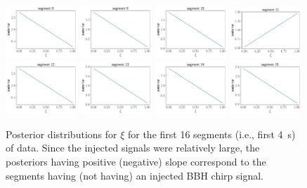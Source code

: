 \begin{figure}[htbp!]
\begin{center}
\includegraphics[width=0.24\textwidth]{Figures/posterior_xi_seg_8}
\includegraphics[width=0.24\textwidth]{Figures/posterior_xi_seg_9}
\includegraphics[width=0.24\textwidth]{Figures/posterior_xi_seg_10}
\includegraphics[width=0.24\textwidth]{Figures/posterior_xi_seg_11}
\includegraphics[width=0.24\textwidth]{Figures/posterior_xi_seg_12}
\includegraphics[width=0.24\textwidth]{Figures/posterior_xi_seg_13}
\includegraphics[width=0.24\textwidth]{Figures/posterior_xi_seg_14}
\includegraphics[width=0.24\textwidth]{Figures/posterior_xi_seg_15}
\caption{Posterior distributions for $\xi$ for the first 16 segments
(i.e., first 4~s) of data.
Since the injected signals were relatively large, the posteriors
having positive (negative) slope correspond to the segments 
having (not having) an injected BBH chirp signal.}
\label{f:posteriors_xi_seg}
\end{center}
\end{figure}
